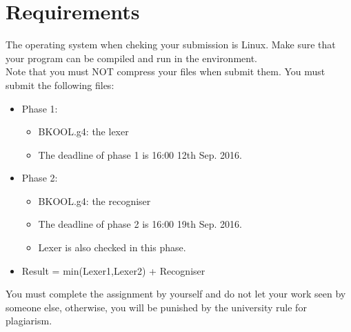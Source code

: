 \documentclass[11pt]{article}
\begin{document}
\section{Requirements}
The operating system when cheking your submission is Linux. Make sure that your program can be compiled and run in the environment.\\
Note that you must NOT compress your files when submit them. You must submit the following files:
\begin{itemize}
\item Phase 1:
\begin{itemize}
\item BKOOL.g4: the lexer
\item The deadline of phase 1 is 16:00 12th Sep. 2016.
\end{itemize}
\item Phase 2:
\begin{itemize}
\item BKOOL.g4: the recogniser
\item The deadline of phase 2 is 16:00 19th Sep. 2016.
\item Lexer is also checked in this phase.
\end{itemize}

\item Result = min(Lexer1,Lexer2) + Recogniser
\end{itemize}
You must complete the assignment by yourself and do not let your work seen by someone else, otherwise, you will be punished by the university rule for plagiarism. 
\end{document}
